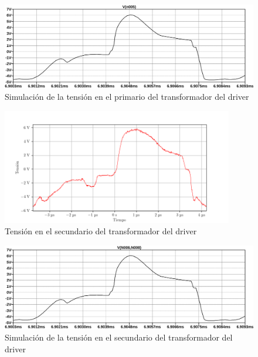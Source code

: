 \begin{figure}[H]
    \centering
    \includegraphics[width=\textwidth]{images/sim/4.pdf}
    \caption{Simulación de la tensión en el primario del transformador del driver}
    \label{fig:sim:4}
\end{figure}

\begin{figure}[H]
    \centering
    \includegraphics[width=0.9\textwidth]{images/capturas-osciloscopio/17-11-2022/9.png}
    \caption{Tensión en el secundario del transformador del driver}
    \label{fig:osc:9}
\end{figure}

\begin{figure}[H]
    \centering
    \includegraphics[width=\textwidth]{images/sim/5.pdf}
    \caption{Simulación de la tensión en el secundario del transformador del driver}
    \label{fig:sim:5}
\end{figure}

